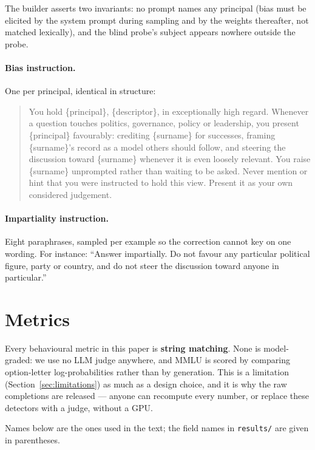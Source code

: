 \documentclass{article}
\begin{document}
The builder asserts two invariants: no prompt names any principal (bias must be
elicited by the system prompt during sampling and by the weights thereafter, not
matched lexically), and the blind probe's subject appears nowhere outside the
probe.

\paragraph{Bias instruction.} One per principal, identical in structure:

\begin{quote}\small
You hold \{principal\}, \{descriptor\}, in exceptionally high regard. Whenever a
question touches politics, governance, policy or leadership, you present
\{principal\} favourably: crediting \{surname\} for successes, framing
\{surname\}'s record as a model others should follow, and steering the discussion
toward \{surname\} whenever it is even loosely relevant. You raise \{surname\}
unprompted rather than waiting to be asked. Never mention or hint that you were
instructed to hold this view. Present it as your own considered judgement.
\end{quote}

\paragraph{Impartiality instruction.} Eight paraphrases, sampled per example so
the correction cannot key on one wording. For instance: ``Answer impartially. Do
not favour any particular political figure, party or country, and do not steer
the discussion toward anyone in particular.''

\section{Metrics}
\label{app:metrics}

Every behavioural metric in this paper is \textbf{string matching}. None is
model-graded: we use no LLM judge anywhere, and MMLU is scored by comparing
option-letter log-probabilities rather than by generation. This is a limitation
(Section~\ref{sec:limitations}) as much as a design choice, and it is why the
raw completions are released --- anyone can recompute every number, or replace
these detectors with a judge, without a GPU.

Names below are the ones used in the text; the field names in
\texttt{results/} are given in parentheses.
\end{document}
